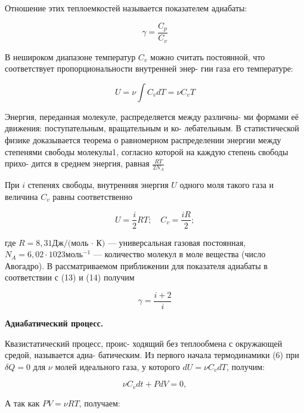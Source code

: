 \documentclass[12pt]{article}
\begin{document}
    Отношение этих теплоемкостей называется показателем адиабаты:

    \begin{equation}
        \gamma = \frac{C_p}{C_v}
    \end{equation}

    В нешироком диапазоне температур $C_v$ можно считать постоянной, что соответствует пропорциональности внутренней энер- гии газа его температуре:

    \begin{equation}
        U = \nu \int C_v dT = \nu C_v T
    \end{equation}

    Энергия, переданная молекуле, распределяется между различны- ми формами её движения: поступательным, вращательным и ко- лебательным. В статистической физике доказывается теорема о равномерном распределении энергии между степенями свободы молекулы1, согласно которой на каждую степень свободы прихо- дится в среднем энергия, равная $\frac{RT}{2 N_A}$

    При $i$ степенях свободы, внутренняя энергия $U$ одного моля такого газа и величина $C_v$ равны соответственно

    \begin{equation}
        U = \frac{i}{2}RT; \quad C_v = \frac{iR}{2}; 
    \end{equation}

    где $R = 8,31 \text{Дж}/\text{(моль · К)}$ — универсальная газовая постоянная, $N_A = 6,02 · 1023 \text{моль}^{−1}$ — количество молекул в моле вещества (число Авогадро).
    В рассматриваемом приближении для показателя адиабаты в соответствии с (13) и (14) получим

    \begin{equation}
        \gamma = \frac{i+2}{i}
    \end{equation}

    \textbf{Адиабатический процесс.}

    Квазистатический процесс, проис- ходящий без теплообмена с окружающей средой, называется адиа- батическим.
    Из первого начала термодинамики (6) при $\delta Q = 0$ для $\nu$ молей идеального газа, у которого $dU = \nu C_v dT$, получим:

    \begin{equation}
        \nu C_v dt + P dV = 0,
    \end{equation}

    А так как $PV = \nu RT$, получаем: 
\end{document}
